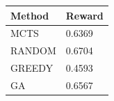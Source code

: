 \begin{tabular}{ll}
\hline
Method & Reward \\
\hline
  MCTS & 0.6369 \\
  RANDOM & 0.6704 \\
  GREEDY & 0.4593 \\
  GA & 0.6567 \\
\hline
\end{tabular}
